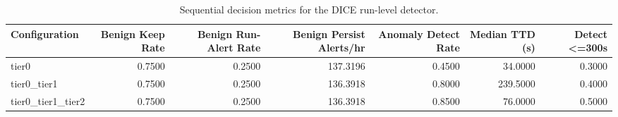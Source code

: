 \begin{table}[t]
\centering
\caption{Sequential decision metrics for the DICE run-level detector.}
\label{tab:dice_sequential_metrics}
\footnotesize
\begin{tabular}{lrrrrrr}
\toprule
Configuration & Benign Keep Rate & Benign Run-Alert Rate & Benign Persist Alerts/hr & Anomaly Detect Rate & Median TTD (s) & Detect <=300s \\
\midrule
tier0 & 0.7500 & 0.2500 & 137.3196 & 0.4500 & 34.0000 & 0.3000 \\
tier0_tier1 & 0.7500 & 0.2500 & 136.3918 & 0.8000 & 239.5000 & 0.4000 \\
tier0_tier1_tier2 & 0.7500 & 0.2500 & 136.3918 & 0.8500 & 76.0000 & 0.5000 \\
\bottomrule
\end{tabular}

\end{table}
